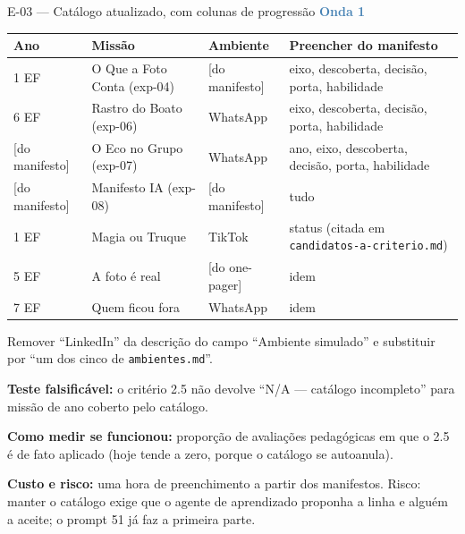 \documentclass[11pt,a4paper]{article}
\newcommand{\onda}[1]{\textcolor{SteelBlue}{\textbf{Onda #1}}}
\begin{document}
\begin{emendabox}{E-03 --- Catálogo atualizado, com colunas de progressão \hfill \onda{1}}
\begin{center}\small
\begin{tabular}{@{}p{1.3cm} p{4.0cm} p{2.9cm} p{6.4cm}@{}}
\toprule
\textbf{Ano} & \textbf{Missão} & \textbf{Ambiente} & \textbf{Preencher do manifesto} \\
\midrule
1\textordmasculine{} EF & O Que a Foto Conta (exp-04) & [do manifesto] & eixo, descoberta, decisão, porta, habilidade \\
6\textordmasculine{} EF & Rastro do Boato (exp-06) & WhatsApp & eixo, descoberta, decisão, porta, habilidade \\
{[do manifesto]} & O Eco no Grupo (exp-07) & WhatsApp & ano, eixo, descoberta, decisão, porta, habilidade \\
{[do manifesto]} & Manifesto IA (exp-08) & [do manifesto] & tudo \\
1\textordmasculine{} EF & Magia ou Truque & TikTok & status (citada em \texttt{candidatos-a-criterio.md}) \\
5\textordmasculine{} EF & A foto é real & [do one-pager] & idem \\
7\textordmasculine{} EF & Quem ficou fora & WhatsApp & idem \\
\bottomrule
\end{tabular}
\end{center}

Remover ``LinkedIn'' da descrição do campo ``Ambiente simulado'' e substituir por ``um dos cinco
de \texttt{ambientes.md}''.

\textbf{Teste falsificável:} o critério 2.5 não devolve ``N/A --- catálogo incompleto'' para
missão de ano coberto pelo catálogo.

\textbf{Como medir se funcionou:} proporção de avaliações pedagógicas em que o 2.5 é de fato
aplicado (hoje tende a zero, porque o catálogo se autoanula).

\textbf{Custo e risco:} uma hora de preenchimento a partir dos manifestos. Risco: manter o
catálogo exige que o agente de aprendizado proponha a linha e alguém a aceite; o prompt 51 já faz
a primeira parte.
\end{emendabox}
\end{document}
